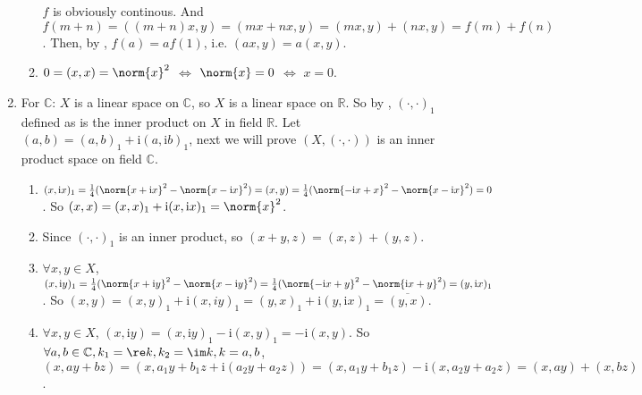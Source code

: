 \documentclass{ctexart}
\begin{document}
\begin{solution}
\begin{enumerate}
\begin{enumerate}
            \iffalse
            \begin{equation}
                \begin{aligned}
                &\lim_{n\to\infty}f(a_n)\\
                =&\lim_{n\to\infty}(a_nx,y)\\
                =&\lim_{n\to\infty}\frac{1}{4}(\norm{a_nx+y}^2-\norm{a_nx-y}^2)\\
                =&\frac{1}{4}(\lim_{n\to\infty}\norm{a_nx+y}^2-\lim_{n\to\infty}\norm{a_nx-y}^2)\\
                =&\frac{1}{4}(\norm{ax+y}^2-\norm{ax-y}^2)\\
                =&(ax,y)\\
                =&f(a)
                \end{aligned}
            \end{equation}
            \fi
            $f$ is obviously continous. And $f(m+n)=((m+n)x,y)=(mx+nx,y)=(mx,y)+(nx,y)=f(m)+f(n)$. Then, by , $f(a)=af(1)$, i.e. $(ax,y)=a(x,y)$.
            \item $0=(x,x)=\norm{x}^2$ $\iff$ $\norm{x}=0$ $\iff$ $x=0$.

        \end{enumerate}
        \item For $\mathbb{C}$: $X$ is a linear space on $\mathbb{C}$, so $X$ is a linear space on $\mathbb{R}$. So by , $(\cdot,\cdot)_1$ defined as  is the inner product on $X$ in field $\mathbb{R}$. Let $(a,b)=(a,b)_1+\mathrm{i}(a,\mathrm{i}b)_1$, next we will prove $(X,(\cdot,\cdot))$ is an inner product space on field $\mathbb{C}$.
        \begin{enumerate}
            \item $(x,\mathrm{i} x)_1=\frac{1}{4}(\norm{x+\mathrm{i}x}^2-\norm{x-\mathrm{i}x}^2)=(x,y)=\frac{1}{4}(\norm{-\mathrm{i}x+x}^2-\norm{x-\mathrm{i}x}^2)=0$. So $(x,x)=(x,x)_1+\mathrm{i}(x,\mathrm{i}x)_1=\norm{x}^2$.
            \item Since $(\cdot,\cdot)_1$ is an inner product, so $(x+y,z)=(x,z)+(y,z)$.
            \item $\forall x,y\in X $, $(x,\mathrm{i}y)_1=\frac{1}{4}(\norm{x+\mathrm{i}y}^2-\norm{x-\mathrm{i}y}^2)=\frac{1}{4}(\norm{-\mathrm{i}x+y}^2-\norm{\mathrm{i}x+y}^2)=(y,\mathrm{i}x)_1$. So $(x,y)=(x,y)_1+\mathrm{i}(x,iy)_1=(y,x)_1+\mathrm{i}(y,\mathrm{i}x)_1=\overline{(y,x)}$. 
            \item $\forall x,y\in X $, $(x,\mathrm{i}y)=(x, \mathrm{i}y)_1-\mathrm{i}(x,y)_1=-\mathrm{i}(x,y)$. So $\forall a,b\in \mathbb{C}, k_1=\re k,k_2=\im k,k=a,b$, $(x,ay+bz)=(x,a_1y+b_1z+\mathrm{i}(a_2y+a_2z))=(x,a_1y+b_1z)-\mathrm{i}(x,a_2y+a_2z)=(x,ay)+(x,bz)$.
        \end{enumerate} 
    \end{enumerate}
\end{solution}
\fi
\end{document}

